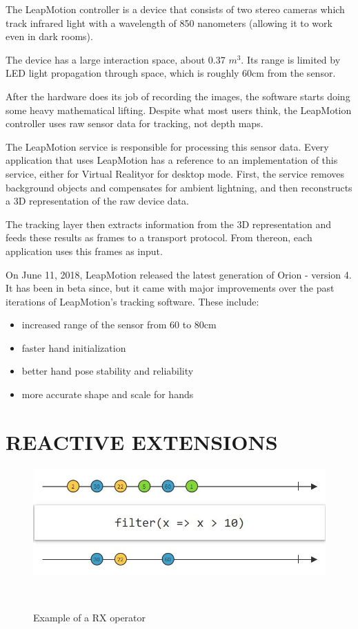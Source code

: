 \documentclass{sigchi}
\def\leap{LeapMotion}
\def\vr{Virtual Reality}
\begin{document}
The \leap{} controller is a device that consists of two stereo cameras which track infrared light with a wavelength of 850 nanometers (allowing it to work even in dark rooms).


The device has a large interaction space, about 0.37 $m^3$. Its range is limited by LED light propagation through space, which is roughly 60cm from the sensor.


After the hardware does its job of recording the images, the software starts doing some heavy mathematical lifting. Despite what most users think, the \leap{} controller uses raw sensor data for tracking, not depth maps.


The \leap{} service is responsible for processing this sensor data. Every application that uses \leap{} has a reference to an implementation of this service, either for \vr or for desktop mode. First, the service removes background objects and compensates for ambient lightning, and then reconstructs a 3D representation of the raw device data.


The tracking layer then extracts information from the 3D representation and feeds these results as frames to a transport protocol. From thereon, each application uses this frames as input.


On June 11, 2018, \leap{} released the latest generation of Orion - version 4. It has been in beta since, but it came with major improvements over the past iterations of \leap{}'s tracking software. These include:

\begin{itemize}
  \item increased range of the sensor from 60 to 80cm
  \item faster hand initialization
  \item better hand pose stability and reliability
  \item more accurate shape and scale for hands
\end{itemize}

\section{REACTIVE EXTENSIONS}

\begin{figure}[H]
  \centering
  \includegraphics[width=0.9\columnwidth]{figures/RX_filter}
  \caption{Example of a RX operator}~\label{fig:figure2}
\end{figure}
  
\end{document}
